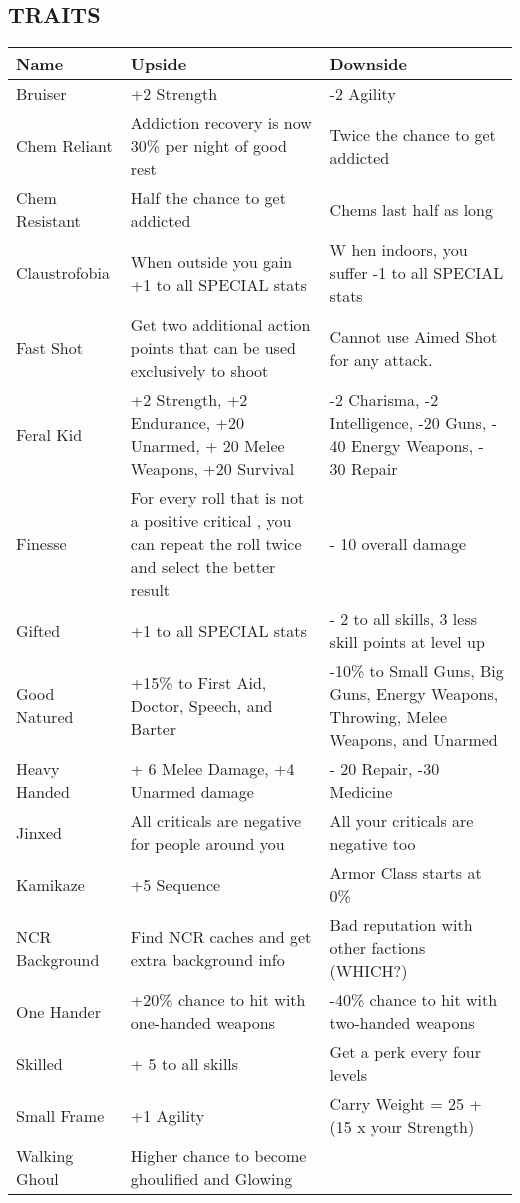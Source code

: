 
\subsection{TRAITS}
\begin{longtable}{|p{3.4cm}|p{6.5cm}|p{6.5cm}|}
\hline
\bfseries Name & \bfseries Upside & \bfseries Downside \\
\hline
\endhead

Bruiser & +2 Strength & -2 Agility \\
Chem Reliant & Addiction recovery is now 30\% per night of good rest  & Twice the chance to get addicted \\
Chem Resistant & Half the chance to get addicted & Chems last half as long \\
Claustrofobia & When outside you gain +1 to all SPECIAL stats & W hen indoors, you suffer -1 to all SPECIAL stats \\
Fast Shot & Get two additional action points that can be used exclusively to shoot & Cannot use Aimed Shot for any attack. \\
Feral Kid & +2 Strength, +2 Endurance, +20 Unarmed, + 20 Melee Weapons, +20 Survival & -2 Charisma, -2 Intelligence, -20 Guns, - 40 Energy Weapons, - 30 Repair \\
Finesse & For every roll that is not a positive critical , you can repeat the roll twice and select the better result  & - 10 overall damage \\
Gifted & +1 to all SPECIAL stats & - 2 to all skills, 3 less skill points at level up \\
Good Natured & +15\% to First Aid, Doctor, Speech, and Barter & -10\% to Small Guns, Big Guns, Energy Weapons, Throwing, Melee Weapons, and Unarmed \\
Heavy Handed & + 6 Melee Damage, +4 Unarmed damage & - 20 Repair, -30 Medicine \\
Jinxed & All criticals are negative for people around you & All your criticals are negative too \\
Kamikaze & +5 Sequence & Armor Class starts at 0\% \\
NCR Background & Find NCR caches and get extra background info & Bad reputation with other factions (WHICH?) \\
One Hander & +20\% chance to hit with one-handed weapons & -40\% chance to hit with two-handed weapons \\
Skilled & + 5 to all skills & Get a perk every four levels \\
Small Frame & +1 Agility & Carry Weight = 25 + (15 x your Strength) \\
Walking Ghoul & Higher chance to become ghoulified and Glowing & \\
\hline
\end{longtable}
